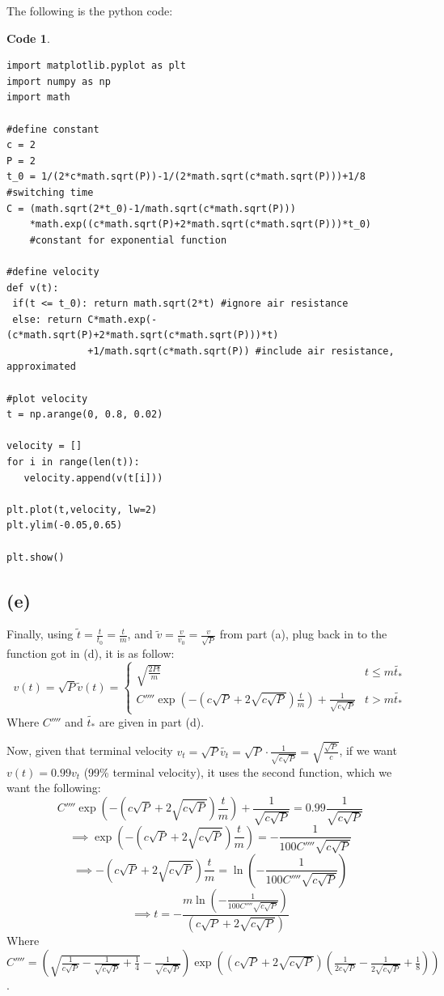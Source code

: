\documentclass{article}
\newtheorem{code}{Code}
\begin{document}
The following is the python code:
\begin{code}

    \hfil

\begin{verbatim}
import matplotlib.pyplot as plt
import numpy as np
import math

#define constant
c = 2
P = 2
t_0 = 1/(2*c*math.sqrt(P))-1/(2*math.sqrt(c*math.sqrt(P)))+1/8 #switching time
C = (math.sqrt(2*t_0)-1/math.sqrt(c*math.sqrt(P)))
    *math.exp((c*math.sqrt(P)+2*math.sqrt(c*math.sqrt(P)))*t_0) 
    #constant for exponential function

#define velocity
def v(t):
 if(t <= t_0): return math.sqrt(2*t) #ignore air resistance
 else: return C*math.exp(-(c*math.sqrt(P)+2*math.sqrt(c*math.sqrt(P)))*t)
              +1/math.sqrt(c*math.sqrt(P)) #include air resistance, approximated

#plot velocity
t = np.arange(0, 0.8, 0.02)

velocity = []
for i in range(len(t)):
   velocity.append(v(t[i]))

plt.plot(t,velocity, lw=2)
plt.ylim(-0.05,0.65)

plt.show()
\end{verbatim}
\end{code}

\hfil

\subsection*{(e)}
Finally, using $\tilde{t}=\frac{t}{t_0}=\frac{t}{m}$, and $\tilde{v}=\frac{v}{v_0}=\frac{v}{\sqrt{P}}$ from part (a), plug back in to the function got in (d), it is as follow:
$$v(t)=\sqrt{P}\tilde{v}(t) = \begin{cases}
    \sqrt{\frac{2Pt}{m}} & t\leq m\tilde{t_*}\\
    C''''\exp\left(-\left(c\sqrt{P}+2\sqrt{c\sqrt{P}}\right)\frac{t}{m}\right)+\frac{1}{\sqrt{c\sqrt{P}}} & t> m\tilde{t_*}
\end{cases}$$ 
Where $C''''$ and $\tilde{t_*}$ are given in part (d).

Now, given that terminal velocity $v_t = \sqrt{P}\tilde{v_t} = \sqrt{P}\cdot \frac{1}{\sqrt{c\sqrt{P}}} = \sqrt{\frac{\sqrt{P}}{c}}$, if we want $v(t) = 0.99 v_t$ (99\% terminal velocity), it uses the second function, which we want the following:
$$C''''\exp\left(-\left(c\sqrt{P}+2\sqrt{c\sqrt{P}}\right)\frac{t}{m}\right)+\frac{1}{\sqrt{c\sqrt{P}}} = 0.99\frac{1}{\sqrt{c\sqrt{P}}}$$
$$\implies \exp\left(-\left(c\sqrt{P}+2\sqrt{c\sqrt{P}}\right)\frac{t}{m}\right) = -\frac{1}{100C''''\sqrt{c\sqrt{P}}}$$
$$\implies -\left(c\sqrt{P}+2\sqrt{c\sqrt{P}}\right)\frac{t}{m}=\ln\left(-\frac{1}{100C''''\sqrt{c\sqrt{P}}}\right)$$
$$\implies t=-\frac{m\ln\left(-\frac{1}{100C''''\sqrt{c\sqrt{P}}}\right)}{\left(c\sqrt{P}+2\sqrt{c\sqrt{P}}\right)}$$
Where $C'''' = \left(\sqrt{\frac{1}{c\sqrt{P}}-\frac{1}{\sqrt{c\sqrt{P}}}+\frac{1}{4}}-\frac{1}{\sqrt{c\sqrt{P}}}\right)\exp\left(\left(c\sqrt{P}+2\sqrt{c\sqrt{P}}\right)\left(\frac{1}{2c\sqrt{P}}-\frac{1}{2\sqrt{c\sqrt{P}}}+\frac{1}{8}\right)\right)$.
\end{document}
